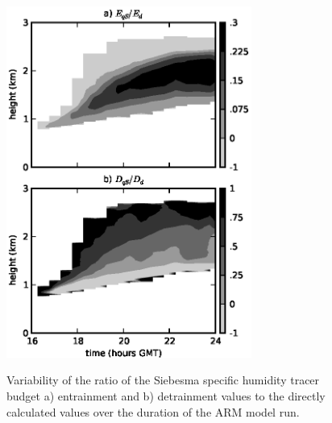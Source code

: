 \documentclass[12pt]{article}
\begin{document}
\begin{figure}[t]
  \noindent\includegraphics[width=19pc]{./figures/entrainment_ratio_variability}\\
  \caption{Variability of the ratio of the Siebesma specific humidity tracer budget a) entrainment
  and b) detrainment values to the directly calculated values over the duration
  of the ARM model run.}
  \label{fig:entrainment_ratio_variability}
\end{figure}
\end{document}
